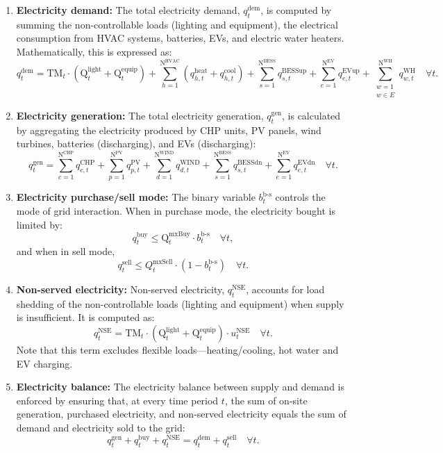 \documentclass[11pt]{article}
\begin{document}
\begin{enumerate}
    \item \textbf{Electricity demand:}
    The total electricity demand, \(q^\text{dem}_t\), is computed by summing the non-controllable loads (lighting and equipment), the electrical consumption from HVAC systems, batteries, EVs, and electric water heaters. Mathematically, this is expressed as:
    \[
    q^\text{dem}_t = \text{TM}_t \cdot (\text{Q}^\text{light}_t + \text{Q}^\text{equip}_t) + \sum_{h=1}^{\text{N}^\text{HVAC}} (q^\text{heat}_{h,t} + q^\text{cool}_{h,t}) + \sum_{s=1}^{\text{N}^\text{BESS}} q^\text{BESSup}_{s,t} + \sum_{e=1}^{\text{N}^\text{EV}} q^\text{EVup}_{e,t} + \sum_{\substack{w=1 \\ w \in E}}^{\text{N}^\text{WH}} q^\text{WH}_{w,t} \quad \forall t.
    \]

    \item \textbf{Electricity generation:}
    The total electricity generation, \(q^\text{gen}_t\), is calculated by aggregating the electricity produced by CHP units, PV panels, wind turbines, batteries (discharging), and EVs (discharging):
    \[
        q^\text{gen}_t = \sum_{c=1}^{\text{N}^\text{CHP}} q^\text{CHP}_{c,t} + \sum_{p=1}^{\text{N}^\text{PV}} q^\text{PV}_{p,t} + \sum_{d=1}^{\text{N}^\text{WIND}} q^\text{WIND}_{d,t} + \sum_{s=1}^{\text{N}^\text{BESS}} q^\text{BESSdn}_{s,t} + \sum_{e=1}^{\text{N}^\text{EV}} q^\text{EVdn}_{e,t} \quad \forall t.
    \]

    \item \textbf{Electricity purchase/sell mode:}
    The binary variable \(b^\text{b-s}_t\) controls the mode of grid interaction. When in purchase mode, the electricity bought is limited by:
    \[
    q^\text{buy}_t \leq \text{Q}^\text{mxBuy}_t \cdot b^\text{b-s}_t \quad \forall t,
    \]
    and when in sell mode,
    \[
    q^\text{sell}_t \leq Q^\text{mxSell}_t \cdot (1-b^\text{b-s}_t) \quad \forall t.
    \]

    \item \textbf{Non-served electricity:}
    Non-served electricity, \(q^\text{NSE}_t\), accounts for load shedding of the non-controllable loads (lighting and equipment) when supply is insufficient. It is computed as:
    \[
    q^\text{NSE}_t = \text{TM}_t \cdot (\text{Q}^\text{light}_t + \text{Q}^\text{equip}_t) \cdot u^\text{NSE}_t \quad \forall t.
    \]
    Note that this term excludes flexible loads---heating/cooling, hot water and EV charging.

    \item \textbf{Electricity balance:}
    The electricity balance between supply and demand is enforced by ensuring that, at every time period \(t\), the sum of on-site generation, purchased electricity, and non-served electricity equals the sum of demand and electricity sold to the grid:
    \[
    q^\text{gen}_t + q^\text{buy}_t + q^\text{NSE}_t = q^\text{dem}_t + q^\text{sell}_t \quad \forall t.
    \]


\end{enumerate}
\end{document}
